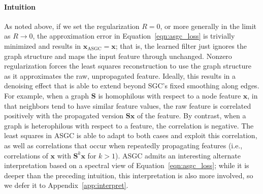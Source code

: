 \documentclass{article}
\newcommand{\Dan}[1]{\textcolor{cyan}{Dan: #1}}
\begin{document}
\paragraph{Intuition} As noted above, if we set the regularization $R=0$, or more generally in the limit as \mbox{$R\to 0$}, the approximation error in Equation~\ref{eqn:asgc_loss} is trivially minimized and results in \mbox{$\bm{x}_\text{ASGC} = \bm{x}$}; that is, the learned filter just ignores the graph structure and maps the input feature through unchanged.
Nonzero regularization forces the least squares reconstruction to use the graph structure as it approximates the raw, unpropagated feature. Ideally, this results in a denoising effect that is able to extend beyond SGC's fixed smoothing along edges. 
For example, when a graph $\bm{S}$ is homophilous with respect to a node feature $\bm{x}$, in that neighbors tend to have similar feature values, the raw feature is correlated positively with the propagated version $\bm{S} \bm{x}$ of the feature. By contrast, when a graph is heterophilous with respect to a feature, the correlation is negative. The least squares in ASGC is able to adapt to both cases and exploit this correlation, as well as correlations that occur when repeatedly propagating features (i.e., correlations of $\bm{x}$ with $\bm{S}^k \bm{x}$ for $k>1$). ASGC admits an interesting alternate interpretation based on a spectral view of Equation~\ref{eqn:asgc_loss}; while it is deeper than the preceding intuition, this interpretation is also more involved, so we defer it to Appendix~\ref{app:interpret}.
\end{document}
